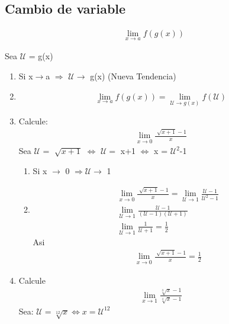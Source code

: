 \documentclass{article}
\begin{document}
\subsection{Cambio de variable}
\begin{center}
    \begin{equation}
        \begin{aligned}
            \lim_{x\rightarrow a }f(g(x))
        \end{aligned}
    \end{equation}
\end{center}Sea $\mathcal{U}$ = g(x) \begin{enumerate}
    \item Si x$\rightarrow$a $\Longrightarrow$  $\mathcal{U}\rightarrow$ g(x) (Nueva Tendencia)
    \item \begin{equation}
        \lim_{x\rightarrow a}f(g(x)) = \lim_{\mathcal{U}\rightarrow g(x)}f(\mathcal{U})
    \end{equation}
    \item Calcule: \begin{equation}
        \begin{aligned}
            \lim_{x\rightarrow 0}\frac{\sqrt[]{x+1}-1}{x}
        \end{aligned}
    \end{equation} Sea $\mathcal{U}$ = $\sqrt[]{x+1}$ $\Longleftrightarrow $
    $\mathcal{U}=$ x+1 $\Longleftrightarrow$ x = $\mathcal{U}^2$-1
    \begin{enumerate}
        \item Si x $\rightarrow$ 0 $\Longrightarrow \mathcal{U} \rightarrow$ 1
        \item \begin{equation}
            \begin{aligned}
                \lim_{x\rightarrow 0} \frac{\sqrt[]{x+1} -1}{x} = 
                \lim_{\mathcal{U}\rightarrow 1}\frac{\mathcal{U}-1}{\mathcal{U}^2 -1} \\
                \lim_{\mathcal{U}\rightarrow 1} \frac{\mathcal{U}-1}{(\mathcal{U}-1)(\mathcal{U}+1)} \\
                \lim_{\mathcal{U}\rightarrow 1} \frac{1}{\mathcal{U}+1} = \frac{1}{2}
            \end{aligned}
        \end{equation} Asi \begin{equation}
            \begin{aligned}
                \lim_{x\rightarrow 0}\frac{\sqrt[]{x+1}-1}{x} = \frac{1}{2}
            \end{aligned}
        \end{equation}
    \end{enumerate}
    \item Calcule \begin{equation}
        \begin{aligned}
            \lim_{x\rightarrow 1}\frac{\sqrt[3]{x}-1}{\sqrt[4]{x}-1}
        \end{aligned}
    \end{equation} Sea: $\mathcal{U}=\sqrt[12]{x}\Longleftrightarrow x = \mathcal{U}^{12}$
\end{enumerate}
\end{document}
